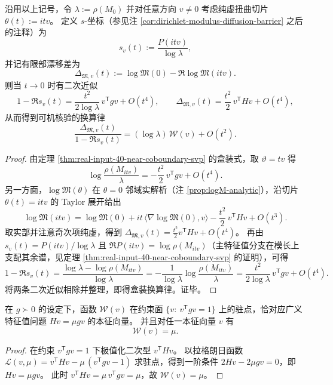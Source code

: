 \begin{proposition}\label{prop:real-input-40-space-time-conversion-law}
沿用以上记号，令 \(\lambda:=\rho(M_0)\) 并对任意方向 \(v\neq 0\) 考虑纯虚扭曲切片
\(
\theta(t):=i t v
\)。
定义 \(s\)-坐标（参见注 \ref{cor:dirichlet-modulus-diffusion-barrier} 之后的注释）为
\[
s_v(t):=\frac{P(itv)}{\log\lambda},
\]
并记有限部漂移差为
\[
\Delta_{\mathfrak{M},v}(t)
:=\log\mathfrak{M}(0)-\Re\log\mathfrak{M}(itv).
\]
则当 \(t\to 0\) 时有二次近似
\[
1-\Re s_v(t)=\frac{t^2}{2\log\lambda}\,v^{\mathsf T}gv+O(t^4),
\qquad
\Delta_{\mathfrak{M},v}(t)=\frac{t^2}{2}\,v^{\mathsf T}Hv+O(t^4),
\]
从而得到可机核验的换算律
\[
\boxed{\;
\frac{\Delta_{\mathfrak{M},v}(t)}{1-\Re s_v(t)}
=(\log\lambda)\,\mathcal{W}(v)+O(t^2).\;}
\]
\end{proposition}
\begin{proof}
由定理 \ref{thm:real-input-40-near-coboundary-svp} 的盒装式，取 \(\vartheta=t v\) 得
\[
\log\frac{\rho(M_{itv})}{\lambda}
=-\frac{t^2}{2}\,v^{\mathsf T}gv+O(t^4).
\]
另一方面，\(\log\mathfrak{M}(\theta)\) 在 \(\theta=0\) 邻域实解析（注 \ref{prop:logM-analytic}），沿切片 \(\theta(t)=itv\) 的 Taylor 展开给出
\[
\log\mathfrak{M}(itv)
=\log\mathfrak{M}(0)+it\,\langle\nabla\log\mathfrak{M}(0),v\rangle-\frac{t^2}{2}\,v^{\mathsf T}Hv+O(t^3).
\]
取实部并注意奇次项纯虚，得到
\(
\Delta_{\mathfrak{M},v}(t)=\frac{t^2}{2}v^{\mathsf T}Hv+O(t^4)
\)。
再由 \(s_v(t)=P(itv)/\log\lambda\) 且 \(\Re P(itv)=\log\rho(M_{itv})\)（主特征值分支在模长上支配其余谱，见定理 \ref{thm:real-input-40-near-coboundary-svp} 的证明），可得
\[
1-\Re s_v(t)
=\frac{\log\lambda-\log\rho(M_{itv})}{\log\lambda}
=-\frac{1}{\log\lambda}\log\frac{\rho(M_{itv})}{\lambda}
=\frac{t^2}{2\log\lambda}\,v^{\mathsf T}gv+O(t^4).
\]
将两条二次近似相除并整理，即得盒装换算律。证毕。
\end{proof}

\begin{proposition}\label{prop:real-input-40-directional-coupling-eigs}
在 \(g\succ 0\) 的设定下，函数 \(\mathcal{W}(v)\) 在约束面 \(\{v:\ v^{\mathsf T}gv=1\}\) 上的驻点，恰对应广义特征值问题 \(Hv=\mu gv\) 的本征向量。
并且对任一本征向量 \(v\) 有
\[
\mathcal{W}(v)=\mu.
\]
\end{proposition}
\begin{proof}
在约束 \(v^{\mathsf T}gv=1\) 下极值化二次型 \(v^{\mathsf T}Hv\)。
以拉格朗日函数
\(
\mathcal{L}(v,\mu)=v^{\mathsf T}Hv-\mu\,(v^{\mathsf T}gv-1)
\)
求驻点，得到一阶条件 \(2Hv-2\mu gv=0\)，即 \(Hv=\mu gv\)。
此时 \(v^{\mathsf T}Hv=\mu\,v^{\mathsf T}gv=\mu\)，故 \(\mathcal{W}(v)=\mu\)。
\end{proof}

